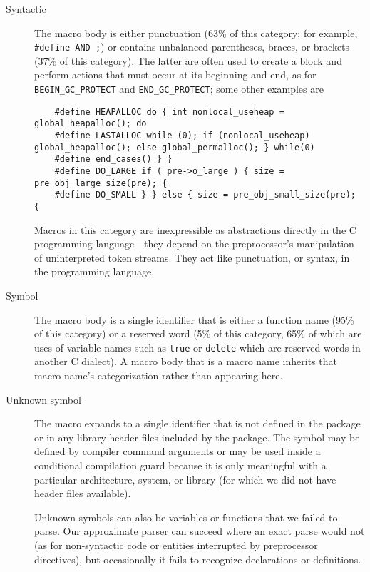 \documentclass[10pt]{article}
\begin{document}
\begin{description}
\item[Syntactic]  The macro body is either punctuation (63\% of this
  category; for example, {\tt \#define AND ;}) or contains unbalanced
  parentheses, braces, or brackets (37\% of this category).  The latter are
  often used to create a block and perform actions that must occur at its
  beginning and end, as for \verb|BEGIN_GC_PROTECT| and
  \verb|END_GC_PROTECT|; some other examples are 
\begin{verbatim}
    #define HEAPALLOC do { int nonlocal_useheap = global_heapalloc(); do
    #define LASTALLOC while (0); if (nonlocal_useheap) global_heapalloc(); else global_permalloc(); } while(0)
    #define end_cases() } }
    #define DO_LARGE if ( pre->o_large ) { size = pre_obj_large_size(pre); {
    #define DO_SMALL } } else { size = pre_obj_small_size(pre); {
\end{verbatim}
  Macros in this category are inexpressible as
  abstractions directly in the C programming language---they depend on the
  preprocessor's manipulation of uninterpreted token streams.  They act
  like punctuation, or syntax, in the programming language.


\item[Symbol]
  The macro body is a single identifier that is either a function name
  (95\% of this category) or a reserved word (5\% of this category, 65\% of
  which are uses of variable names such as {\tt true} or {\tt delete} which
  are reserved words in another C dialect).  A macro body that is a macro
  name inherits that macro name's categorization rather than appearing
  here.


\item[Unknown symbol]
  The macro expands to a single identifier that is not defined in the package
  or in any library header files included by the package.  The symbol may
  be defined by compiler command arguments or may be used inside a
  conditional compilation guard because it is only meaningful 
  with a particular architecture, system, or library (for which we did not
  have header files available).
  
  Unknown symbols can also be variables or functions that we failed to
  parse.  Our approximate parser can succeed where an exact parse would not
  (as for non-syntactic code or entities interrupted by preprocessor
  directives), but occasionally it fails to recognize declarations or
  definitions.


\end{description}
\end{document}
